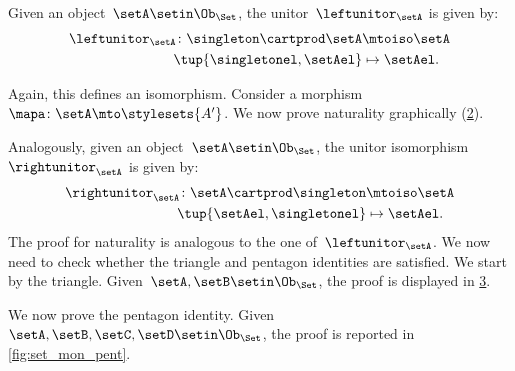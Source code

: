 \begin{example}
    \begin{figure}[h!]
        \centering
        \caption{}
        \label{fig:monoidal_set_ass_nat}
    \end{figure}

    Given an object~$\setA\setin \Ob_\Set$, the unitor~$\leftunitor_\setA$ is given by:
    \begin{equation}
        \label{eq:set_mon_prod_4}
        \begin{aligned}
            \leftunitor_\setA\colon \singleton \cartprod \setA & \mtoiso \setA \\
            \tup{\singletonel,\setAel}                         & \mapsto \setAel.
        \end{aligned}
    \end{equation}

    Again, this defines an isomorphism.
    Consider a morphism~$\mapa\colon \setA\mto \stylesets{A'}$.
    We now prove naturality graphically (\cref{fig:monoidal_set_unit_nat}).

    \begin{figure}[h!]
        \centering
        \caption{}
        \label{fig:monoidal_set_unit_nat}
    \end{figure}

    Analogously, given an object~$\setA\setin \Ob_{\Set}$, the unitor isomorphism~$\rightunitor_\setA$ is given by:
    \begin{equation}
        \label{eq:set_mon_prod_5}
        \begin{aligned}
            \rightunitor_\setA\colon \setA\cartprod \singleton & \mtoiso \setA \\
            \tup{\setAel,\singletonel}                         & \mapsto \setAel.
        \end{aligned}
    \end{equation}
    The proof for naturality is analogous to the one of~$\leftunitor_\setA$.
    We now need to check whether the triangle and pentagon identities are satisfied.
    We start by the triangle.
    Given~$\setA,\setB\setin \Ob_{\Set}$, the proof is displayed in \cref{fig:set_mon_triangle}.

    \begin{figure}[h]
        \centering
        \caption{}
        \label{fig:set_mon_triangle}
    \end{figure}

    We now prove the pentagon identity.
    Given~$\setA,\setB,\setC,\setD\setin \Ob_\Set$, the proof is reported in \cref{fig:set_mon_pent}.

    \begin{figure*}[h]
        \centering
        \caption{}
        \label{fig:set_mon_pent}
    \end{figure*}
\end{example}

